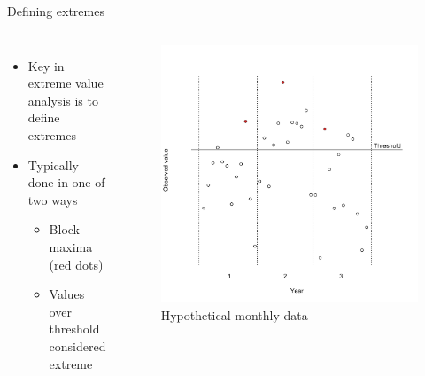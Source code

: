 \documentclass{beamer}
\begin{document}
\begin{frame}{Defining extremes}
\begin{columns}[c]
  \begin{itemize} \setlength{\itemsep}{1em}
    \item Key in extreme value analysis is to define extremes
    \item Typically done in one of two ways
    \begin{itemize}
      \item Block maxima (red dots)
      \item Values over threshold considered extreme
    \end{itemize}
  \end{itemize}

  \begin{figure}
    \includegraphics[width=1\linewidth, trim=0 0.5in 0 1in]{./plots/define_extreme.pdf}
    \caption{Hypothetical monthly data}
    \end{figure}
\end{columns}
\end{frame}
\end{document}
